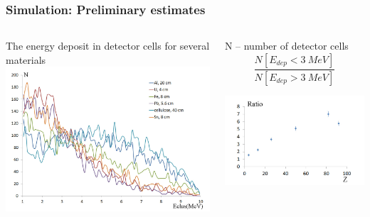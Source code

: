 \documentclass[11pt]{beamer}
\begin{document}
\begin{frame}
    \frametitle{Simulation: Preliminary estimates}
    \begin{columns}
        \begin{column}{0.5\textwidth}
            The energy deposit in detector cells for several materials\\
            \includegraphics[width=1\textwidth]{figures/sim_1.jpeg}
            
        \end{column}
        \begin{column}{0.5\textwidth}
            N -- number of detector cells
            $$
           \frac{N[E_{dep} < 3~MeV]}
            {N[E_{dep} > 3~MeV]}
            $$
       
            \includegraphics[width=1\textwidth]{figures/sim_2.jpeg}
        \end{column}
    \end{columns}  
\end{frame}
\end{document}
